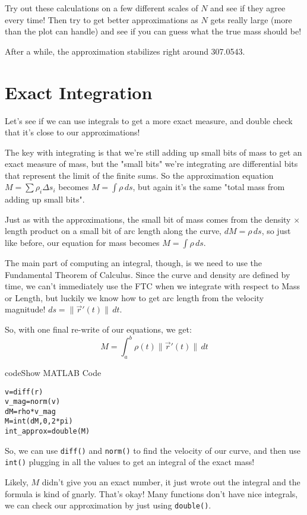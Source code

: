 \documentclass{ximera}
\begin{document}
Try out these calculations on a few different scales of $N$ and see if they agree every time! Then try to get better approximations as $N$ gets really large (more than the plot can handle) and see if you can guess what the true mass should be!

After a while, the approximation stabilizes right around 307.0543.

\section*{Exact Integration}

Let's see if we can use integrals to get a more exact measure, and double check that it's close to our approximations!

The key with integrating is that we're still adding up small bits of mass to get an exact measure of mass, but the "small bits" we're integrating are differential bits that represent the limit of the finite sums. So the approximation equation $M = \sum \rho_i \Delta s_i$ becomes $M = \int \rho \, ds$, but again it's the same "total mass from adding up small bits". 

Just as with the approximations, the small bit of mass comes from the density $\times$ length product on a small bit of arc length along the curve, $dM = \rho \, ds$, so just like before, our equation for mass becomes $M = \int \rho \, ds$.

The main part of computing an integral, though, is we need to use the Fundamental Theorem of Calculus. Since the curve and density are defined by time, we can't immediately use the FTC when we integrate with respect to Mass or Length, but luckily we know how to get arc length from the velocity magnitude! $ds = \|\vec{r}'(t)\| \, dt$.

So, with one final re-write of our equations, we get:
$$M = \int_a^b \rho(t) \|\vec{r}'(t)\| \, dt$$

\begin{expandable}{code}{Show MATLAB Code}
\begin{verbatim}
v=diff(r)
v_mag=norm(v)
dM=rho*v_mag
M=int(dM,0,2*pi)
int_approx=double(M)
\end{verbatim}
\end{expandable}

So, we can use \texttt{diff()} and \texttt{norm()} to find the velocity of our curve, and then use \texttt{int()} plugging in all the values to get an integral of the exact mass!

Likely, $M$ didn't give you an exact number, it just wrote out the integral and the formula is kind of gnarly. That's okay! Many functions don't have nice integrals, we can check our approximation by just using \texttt{double()}.
\end{document}
